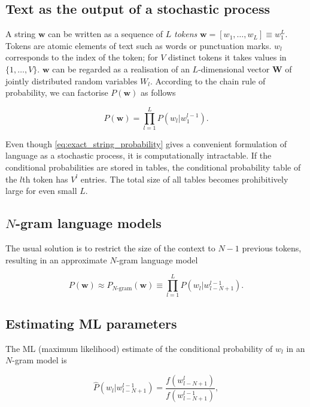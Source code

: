 \documentclass[draft]{IIBproject}
\begin{document}
\FloatBarrier
\subsection{Text as the output of a stochastic process}

A string $\mathbf w$ can be written as a sequence of $L$ \emph{tokens} $\mathbf w = [ w_1, \dots, w_L ] \equiv w_1^L$. Tokens are atomic elements of text such as words or punctuation marks. $w_l$ corresponds to the index of the token; for $V$ distinct tokens it takes values in $\{1, \dots, V\}$. $\mathbf w$ can be regarded as a realisation of an $L$-dimensional vector $\mathbf W$ of jointly distributed random variables $W_l$. According to the chain rule of probability, we can factorise $P(\mathbf w)$ as follows

\begin{equation}
\label{eq:exact_string_probability}
P(\mathbf w) = \prod_{l=1}^{L} P( w_l | w_1^{l-1} ) .
\end{equation}

Even though \cref{eq:exact_string_probability} gives a convenient formulation of language as a stochastic process, it is computationally intractable. If the conditional probabilities are stored in tables, the conditional probability table of the $l$th token has $V^l$ entries. The total size of all tables becomes prohibitively large for even small $L$.

\FloatBarrier
\subsection{$N$-gram language models}

The usual solution is to restrict the size of the context to $N{-}1$ previous tokens, resulting in an approximate $N$-gram language model

\begin{equation}
\label{eq:ngram_string_probability}
P(\mathbf w) \approx P_{\text{$N$-gram}}(\mathbf w) \equiv \prod_{l=1}^{L} P( w_l | w_{l-N+1}^{l-1} ).
\end{equation}

\FloatBarrier
\subsection{Estimating ML parameters}

The ML (maximum likelihood) estimate of the conditional probability of $w_l$ in an $N$-gram model is

\begin{equation}
\label{eq:ml_conditional_token_probability}
\hat P( w_l | w_{l-N+1}^{l-1} ) = \frac {f(w_{l-N+1}^l)} {f(w_{l-N+1}^{l-1})},
\end{equation}
\end{document}
